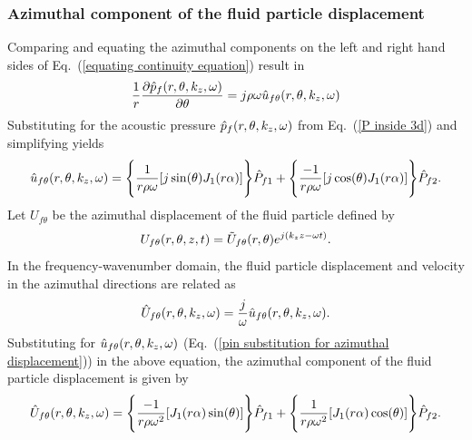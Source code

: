 \documentclass[11pt,cleanfoot]{asme2ej}
\begin{document}
\subsubsection{Azimuthal component of the fluid particle displacement}
Comparing and equating the azimuthal components on the left and right hand sides of Eq.~(\ref{equating continuity equation}) result in
\begin{equation}\label{pin j direction}
    \frac{1}{r}\frac{\partial \Hat{p}_f(r,\theta,k_z,\omega)}{\partial \theta} = j\rho\omega \Hat{u}_{f\theta}(r,\theta,k_z,\omega)
\end{equation}
Substituting for the acoustic pressure $\Hat{p}_f(r,\theta,k_z,\omega)$ from Eq.~(\ref{P inside 3d}) and simplifying yields
\begin{equation}\label{pin substitution for azimuthal displacement}
    \Hat{u}_{f\theta}(r,\theta,k_z,\omega) = \Bigg\{\frac{1}{r\rho\omega}[j \sin(\theta)J_1(r\alpha)]\Bigg\}\Hat{P}_{f1} + \Bigg\{\frac{-1}{r\rho\omega}[j\cos(\theta)J_1(r\alpha)]\Bigg\}\Hat{P}_{f2}.
\end{equation}
Let $U_{f\theta}$ be the azimuthal displacement of the fluid particle defined by
\begin{equation}\label{azim disp 3d derivation}
    U_{f\theta}(r,\theta,z,t) = \Tilde{U}_{f\theta}(r,\theta) e^{j(k_z z - \omega t)}.
\end{equation}
In the frequency-wavenumber domain, the fluid particle displacement and velocity in the azimuthal directions are related as
\begin{equation}\label{equating azimuthal disp and vel}
    \Hat{U}_{f\theta}(r,\theta,k_z,\omega) = \frac{j}{\omega}\Hat{u}_{f\theta}(r,\theta,k_z,\omega).
\end{equation}
Substituting for $\Hat{u}_{f\theta}(r,\theta,k_z,\omega)$ (Eq.~(\ref{pin substitution for azimuthal displacement})) in the above equation, the azimuthal component of the fluid particle displacement is given by
\begin{equation}\label{azimuthal displacement inside 3d}
    \Hat{U}_{f\theta}(r,\theta,k_z,\omega) =\\ \Bigg\{\frac{-1}{r\rho\omega^2}[J_1(r\alpha)\sin(\theta)]\Bigg\}\Hat{P}_{f1} + \Bigg\{\frac{1}{r\rho\omega^2}[J_1(r\alpha)\cos(\theta)]\Bigg\}\Hat{P}_{f2}.
\end{equation}


\end{document}
